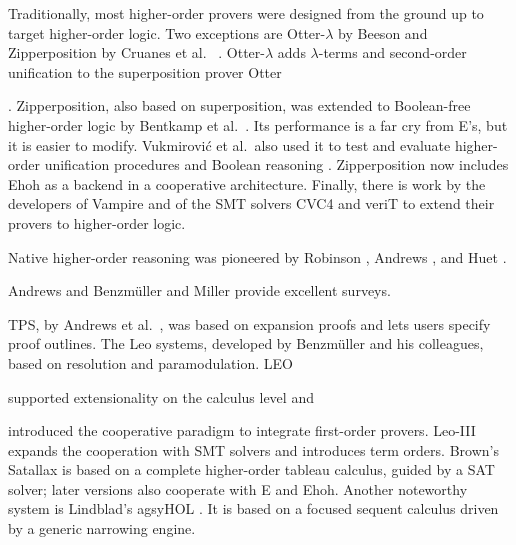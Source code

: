   \begin{sloppypar}
  Traditionally, most higher-order provers were designed from the ground up
  to target higher-order logic. Two
  exceptions are Otter-$\lambda$ by Beeson \cite{mb-04-lam-logic} and
  Zipperposition by Cruanes et al.\ %
  \cite{sc-15-simon-phd,sc-supind-17}. \hbox{Otter-$\lambda$}
  adds $\lambda$-terms and second-order unification to
  the superposition prover Otter\begin{rep} \cite{mcc-03-otter}\end{rep}.
  Zipperposition, also based on superposition, was extended
  to Bool\-e\-an-free higher-order logic by Bentkamp et al.\
  \cite{bbtvw-21-sup-lam}. Its performance is a far cry from E's, but
  it is easier to modify.
  Vukmirovi\'c et al.\ also used it to test and evaluate higher-order unification
  procedures \cite{vbn-21-unif} and Boolean reasoning
  \cite{vn-20-bools}.
  Zipperposition now includes Ehoh as a backend in a cooperative
  architecture.
  Finally, there is work by the developers of Vampire
  \cite{br-19-restricted-unif} and of the SMT solvers CVC4 and veriT
  \cite{brotb-19-ho-smt} to extend their provers to higher-order logic.
  \end{sloppypar}
  
  Native higher-order reasoning was pioneered by Rob\-in\-son
  \cite{ar-69-hol}, Andrews \cite{pa-71-type-theory}, and Huet
  \cite{gh-73-hol}.\begin{rep} Andrews \cite{pa-01-classical-ty-thy} and Benz\-m\"uller and Miller
  \cite{bm-14-automation-ho} provide excellent surveys.\end{rep}
  TPS, by Andrews et al.~\cite{abinpx-96-tps}, was
  based on expansion proofs and lets users specify proof outlines.
  The Leo \confrep{}{family of }systems, developed by Benzm\"uller and his colleagues,
  \confrep{are}{is} based on resolution and paramodulation.
  LEO~\cite{cbmk-98-leo} \begin{rep}supported extensionality
  on the calculus level and \end{rep}introduced the cooperative paradigm to
  integrate first-order provers.
  Leo-III \cite{sb-21-leo3} expands the cooperation with
  SMT solvers
  and introduces term orders.
  Brown's Sat\-al\-lax \cite{cb-12-satallax} is based on a
  complete higher-order tableau calculus,
  guided by a SAT solver; later versions also cooperate with E and Ehoh.
  Another noteworthy sys\-tem is Lindblad's agsy\-HOL \cite{fl-14-agsyhol}.
  It is based on a focused sequent calculus driven by a generic narrowing engine.
  
